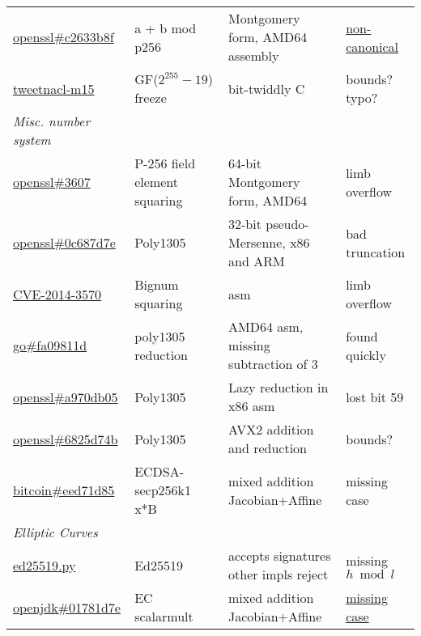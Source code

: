 \documentclass[conference,letterpaper]{IEEEtran}
\begin{document}
\begin{figure*}
\begin{tabular}{llll}
 \href{https://git.openssl.org/gitweb/?p=openssl.git;a=commitdiff;h=b62b2454fadfccaf5e055a1810d72174c2633b8f;ds=sidebyside}{openssl\#c2633b8f} & a + b mod p256 &  Montgomery form, AMD64 assembly & \href{https://mta.openssl.org/pipermail/openssl-dev/2016-August/008179.html}{non-canonical}\\
 \href{http://seb.dbzteam.org/blog/2014/04/28/tweetnacl_arithmetic_bug.html}{tweetnacl-m15} & GF($2^{255}-19$) freeze & bit-twiddly C & bounds? typo?\\
    \hline \emph{Misc. number system} \\ \hline
 \href{https://rt.openssl.org/Ticket/Display.html?id=3607}{openssl\#3607}  & P-256 field element squaring & 64-bit Montgomery form, AMD64 & limb overflow\\
 \href{https://git.openssl.org/gitweb/?p=openssl.git;a=commitdiff;h=dc3c5067cd90f3f2159e5d53c57b92730c687d7e;ds=sidebyside}{openssl\#0c687d7e} & Poly1305 & 32-bit pseudo-Mersenne, x86 and ARM & bad truncation\\
 \href{https://github.com/openssl/openssl/commit/a7a44ba55cb4f884c6bc9ceac90072dea38e66d0}{CVE-2014-3570} & Bignum squaring & asm &  limb overflow\\
 \href{https://github.com/golang/crypto/commit/84e98f45760e87786b7f24603b8166a6fa09811d}{go\#fa09811d} & poly1305 reduction & AMD64 asm, missing subtraction of 3 & found quickly\\
 \href{https://git.openssl.org/gitweb/?p=openssl.git;a=commitdiff;h=bbe9769ba66ab2512678a87b0d9b266ba970db05;ds=sidebyside}{openssl\#a970db05} & Poly1305 &  Lazy reduction in x86 asm & lost bit 59\\
 \href{https://git.openssl.org/gitweb/?p=openssl.git;a=commitdiff;h=1ea8ae5090f557fea2e5b4d5758b10566825d74b;ds=sidebyside}{openssl\#6825d74b} & Poly1305 & AVX2 addition and reduction & bounds?\\
 \href{https://github.com/bitcoin-core/secp256k1/commit/5de4c5dffd22aa4510a5c97d0ad4a9c2eed71d85}{bitcoin\#eed71d85} & ECDSA-secp256k1 x*B & mixed addition Jacobian+Affine & missing case\\
    \hline \emph{Elliptic Curves} \\ \hline
 \href{https://ed25519.cr.yp.to/python/ed25519.py}{ed25519.py} & Ed25519 & accepts signatures other impls reject & missing $h \bmod l$\\
 \href{http://hg.openjdk.java.net/jdk8u/jdk8u/jdk/rev/d99101781d7e}{openjdk\#01781d7e} & EC scalarmult & mixed addition Jacobian+Affine & \href{https://twitter.com/asanso/status/887691580018176000}{missing case}\\

\end{tabular}
\end{figure*}
\end{document}
